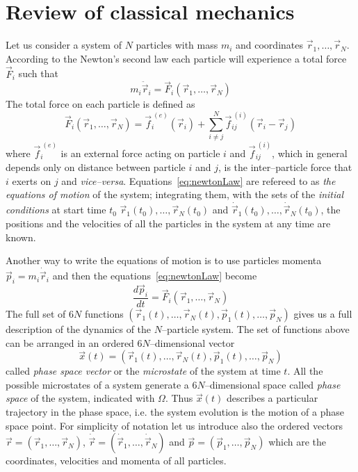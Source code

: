 \section{Review of classical mechanics}
Let us consider a system of $N$ particles with mass $m_i$ and coordinates $\vec r_1,\dots,\vec r_N$. According
to the Newton's second law each particle will experience a total force $\vec F_i$ such that
\begin{equation}
	m_i \ddot{\vec{r}}_i = \vec F_i(\vec r_1,\dots,\vec r_N)
	\label{eq:newtonLaw}
\end{equation}
The total force on each particle is defined as
\begin{equation*}
	\vec F_i(\vec r_1,\dots,\vec r_N) = \vec{f}_i^{\ (e)}(\vec r_i) + \sum_{i\ne j}^N \vec{f}_{ij}^{\ (i)}(\vec r_i - \vec r_j )
\end{equation*}
where $\vec{f}_i^{\ (e)}$ is an external force acting on particle $i$ and $\vec{f}_{ij}^{\ (i)}$, which in general
depends only on distance between particle $i$ and $j$, is the inter--particle force that $i$ exerts on $j$ and
\textit{vice--versa}. Equations~\eqref{eq:newtonLaw} are refereed to as \textit{the equations of motion} of the
system; integrating them, with the sets of the \textit{initial conditions} at start time
$t_0$ $\vec r_1(t_0),\dots,\vec r_N(t_0)$ and $\dot{\vec{r}}_1(t_0),\dots,\dot{\vec{r}}_N(t_0)$, the positions
and the velocities of all the particles in the system at any time are known.

Another way to write the equations of motion is to use particles momenta $\vec p_i = m_i \dot{\vec{r}}_i$ and then
the equations~\eqref{eq:newtonLaw} become
\begin{equation}
	\frac{d\vec p_i}{dt} = \vec F_i(\vec r_1,\dots,\vec r_N)
	\label{eq:newtonLawMom}
\end{equation}
The full set of $6N$ functions $(\vec r_1(t),\dots,\vec r_N(t),\vec p_1(t),\dots,\vec p_N)$ gives us a full
description of the dynamics of the $N$--particle system. The set of functions above can be arranged in an ordered
$6N$--dimensional vector
\begin{equation}
	\vec x(t) = (\vec r_1(t),\dots,\vec r_N(t),\vec p_1(t),\dots,\vec p_N)
	\label{eq:phSpaceVector}
\end{equation}
called \textit{phase space vector} or the \textit{microstate} of the system at time $t$. All the possible
microstates of a system generate a $6N$--dimensional space called \textit{phase space} of the system, indicated
with $\Omega$. Thus $\vec x(t)$ describes a particular trajectory in the phase space, i.e. the system evolution
is the motion of a phase space point. For simplicity of notation let us introduce also the ordered vectors
$\vec r = (\vec r_1, \dots, \vec r_N)$, $\dot{\vec r} = (\dot{\vec{r}}_1,\dots,\dot{\vec{r}}_N)$ and
$\vec p = (\vec p_1, \dots, \vec p_N)$ which are the coordinates, velocities and momenta of all particles.

